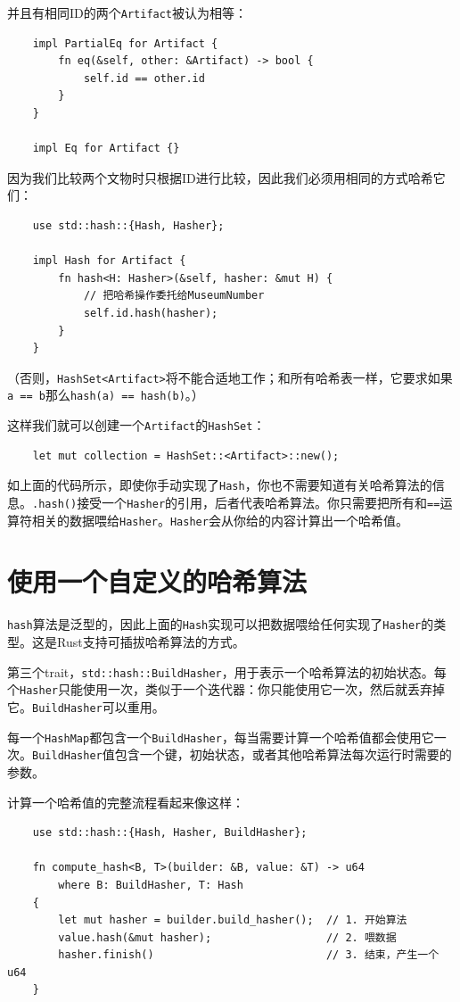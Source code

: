 并且有相同ID的两个\texttt{Artifact}被认为相等：
\begin{verbatim}
    impl PartialEq for Artifact {
        fn eq(&self, other: &Artifact) -> bool {
            self.id == other.id
        }
    }

    impl Eq for Artifact {}
\end{verbatim}

因为我们比较两个文物时只根据ID进行比较，因此我们必须用相同的方式哈希它们：
\begin{verbatim}
    use std::hash::{Hash, Hasher};

    impl Hash for Artifact {
        fn hash<H: Hasher>(&self, hasher: &mut H) {
            // 把哈希操作委托给MuseumNumber
            self.id.hash(hasher);
        }
    }
\end{verbatim}
（否则，\texttt{HashSet<Artifact>}将不能合适地工作；和所有哈希表一样，它要求如果\texttt{a == b}那么\texttt{hash(a) == hash(b)}。）

这样我们就可以创建一个\texttt{Artifact}的\texttt{HashSet}：
\begin{verbatim}
    let mut collection = HashSet::<Artifact>::new();
\end{verbatim}

如上面的代码所示，即使你手动实现了\texttt{Hash}，你也不需要知道有关哈希算法的信息。\texttt{.hash()}接受一个\texttt{Hasher}的引用，后者代表哈希算法。你只需要把所有和\texttt{==}运算符相关的数据喂给\texttt{Hasher}。\texttt{Hasher}会从你给的内容计算出一个哈希值。

\section{使用一个自定义的哈希算法}

\texttt{hash}算法是泛型的，因此上面的\texttt{Hash}实现可以把数据喂给任何实现了\texttt{Hasher}的类型。这是Rust支持可插拔哈希算法的方式。

第三个trait，\texttt{std::hash::BuildHasher}，用于表示一个哈希算法的初始状态。每个\texttt{Hasher}只能使用一次，类似于一个迭代器：你只能使用它一次，然后就丢弃掉它。\texttt{BuildHasher}可以重用。

每一个\texttt{HashMap}都包含一个\texttt{BuildHasher}，每当需要计算一个哈希值都会使用它一次。\texttt{BuildHasher}值包含一个键，初始状态，或者其他哈希算法每次运行时需要的参数。

计算一个哈希值的完整流程看起来像这样：
\begin{verbatim}
    use std::hash::{Hash, Hasher, BuildHasher};

    fn compute_hash<B, T>(builder: &B, value: &T) -> u64
        where B: BuildHasher, T: Hash
    {
        let mut hasher = builder.build_hasher();  // 1. 开始算法
        value.hash(&mut hasher);                  // 2. 喂数据
        hasher.finish()                           // 3. 结束，产生一个u64
    }
\end{verbatim}

